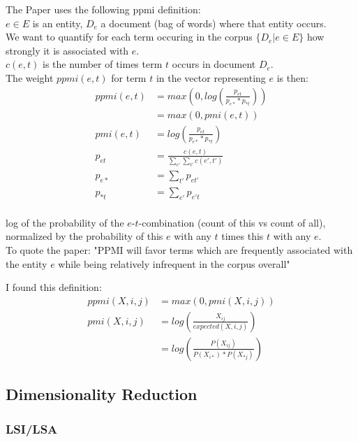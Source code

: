 The Paper uses the following \gls{ppmi} definition:\\ 

\noindent $e \in E$ is an entity, $D_e$ a document (bag of words) where that entity occurs.\\
We want to quantify for each term occuring in the corpus $\{D_e | e \in E\}$ how strongly it is associated with $e$.\\
$c(e,t)$ is the number of times term $t$ occurs in document $D_e$. \\
The weight $ppmi(e,t)$ for term $t$ in the vector representing $e$ is then:
\begin{align*}
ppmi(e,t) &= max\left(0, log\left( \frac{p_{et}}{p_{e*}*p_{*t}} \right) \right) \\
          &= max\left(0, pmi(e,t) \right) \\
 pmi(e,t) &= log\left( \frac{p_{et}}{p_{e*}*p_{*t}} \right) \\          
   p_{et} &= \frac{c(e,t)}{\sum_{e'}\sum_{t'} c(e',t')} \\
   p_{e*} &= \sum_{t'}p_{et'} \\
   p_{*t} &= \sum_{e'}p_{e't} \\
\end{align*}

\noindent log of the probability of the $e$-$t$-combination (count of this vs count of all), normalized by the probability of this $e$ with any $t$ times this $t$ with any $e$.\\
To quote the paper: "PPMI will favor terms which are frequently associated with the entity $e$ while being relatively infrequent in the corpus overall"

\vspace{30px}

I found this definition:
\begin{align*}
ppmi(X,i,j) &= max(0, pmi(X,i,j)) \\
pmi(X,i,j)  &= log\left( \frac{X_{ij}}{expected(X,i,j)} \right) \\
            &= log\left( \frac{P(X_{ij})}{P(X_{i*}) * P(X_{*j})} \right)
\end{align*}


\subsection{Dimensionality Reduction}

\subsubsection*{LSI/LSA}

